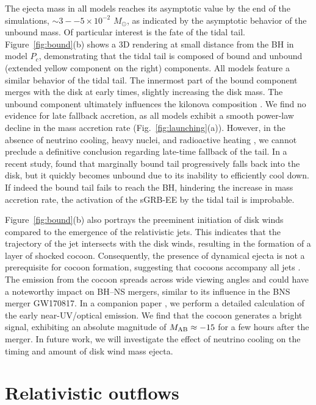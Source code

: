 \documentclass[twocolumn,dvipsnames]{aastex62}
\newcommand{\msun}{\,{M_{\odot}}}
\begin{document}
The ejecta mass in all models reaches its asymptotic value by the end of the simulations, $ \sim 3--5\times 10^{-2}\,\msun $, as indicated by the asymptotic behavior of the unbound mass. Of particular interest is the fate of the tidal tail. Figure~\ref{fig:bound}(b) shows a 3D rendering at small distance from the BH in model $ P_c $, demonstrating that the tidal tail is composed of bound and unbound (extended yellow component on the right) components. All models feature a similar behavior of the tidal tail. The innermost part of the bound component merges with the disk at early times, slightly increasing the disk mass. The unbound component ultimately influences the kilonova composition \citep[see e.g.,][]{Fernandez2017}. We find no evidence for late fallback accretion, as all models exhibit a smooth power-law decline in the mass accretion rate (Fig.~\ref{fig:launching}(a)). However, in the absence of neutrino cooling, heavy nuclei, and radioactive heating \citep[e.g.,][]{Desai2019,Haddadi2023}, we cannot preclude a definitive conclusion regarding late-time fallback of the tail. In a recent study, \citet{Metzger2021} found that marginally bound tail progressively falls back into the disk, but it quickly becomes unbound due to its inability to efficiently cool down. If indeed the bound tail fails to reach the BH, hindering the increase in mass accretion rate, the activation of the sGRB-EE by the tidal tail \citep{Metzger2010} is improbable.

Figure~\ref{fig:bound}(b) also portrays the preeminent initiation of disk winds compared to the emergence of the relativistic jets. This indicates that the trajectory of the jet intersects with the disk winds, resulting in the formation of a layer of shocked cocoon. Consequently, the presence of dynamical ejecta is not a prerequisite for cocoon formation, suggesting that cocoons accompany all jets \citep[see also][]{Gottlieb2022d}. The emission from the cocoon spreads across wide viewing angles and could have a noteworthy impact on BH--NS mergers, similar to its influence in the BNS merger GW170817. In a companion paper \citet{Gottlieb2023b}, we perform a detailed calculation of the early near-UV/optical emission. We find that the cocoon generates a bright signal, exhibiting an absolute magnitude of $M_{\rm AB} \approx -15 $ for a few hours after the merger. In future work, we will investigate the effect of neutrino cooling on the timing and amount of disk wind mass ejecta. 


\section{Relativistic outflows}\label{sec:outflow}
\end{document}
